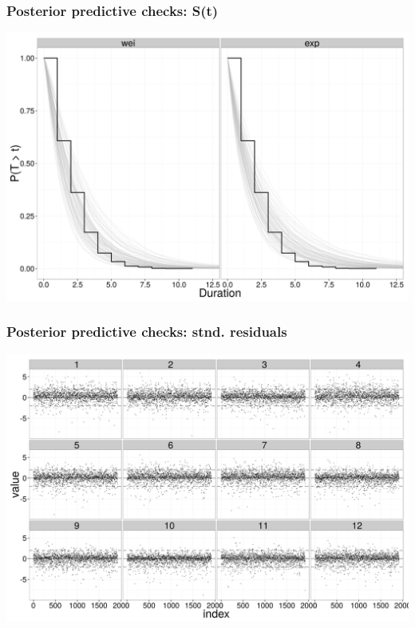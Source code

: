 \documentclass{beamer}
\begin{document}
\begin{frame}
  \frametitle{Posterior predictive checks: S(t)}
  \begin{center}
    \includegraphics[height = 0.8\textheight, width = \textwidth,  keepaspectratio = true]{figure/survival_function}
  \end{center}
\end{frame}

\begin{frame}
  \frametitle{Posterior predictive checks: stnd. residuals}
  \begin{center}
    \includegraphics[height = 0.8\textheight, width = \textwidth,  keepaspectratio = true]{figure/residual_plot}
  \end{center}
\end{frame}
\end{document}
